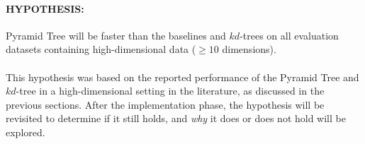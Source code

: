 \paragraph{\textbf{HYPOTHESIS:}} Pyramid Tree will be faster than the baselines and $kd$-trees on all evaluation datasets containing high-dimensional data ($\geq 10$ dimensions).

\paragraph{}

This hypothesis was based on the reported performance of the Pyramid Tree and $kd$-tree in a high-dimensional setting in the literature, as discussed in the previous sections. After the implementation phase, the hypothesis will be revisited to determine if it still holds, and \textit{why} it does or does not hold will be explored.